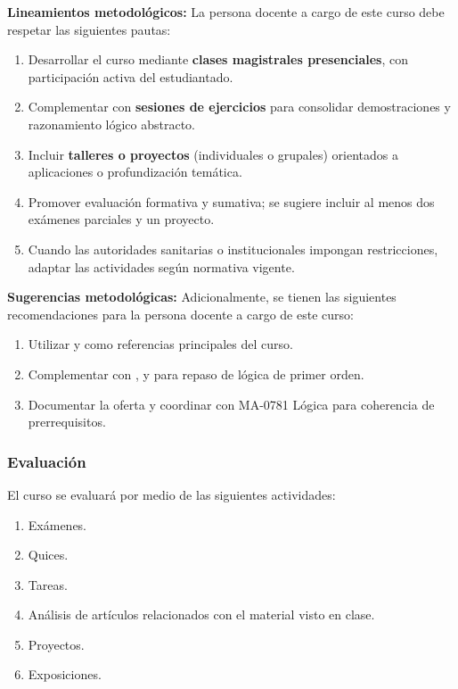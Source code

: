 \begin{refsection}
\noindent \textbf{Lineamientos metodológicos:} La persona docente a cargo de este curso debe respetar las siguientes pautas:

\begin{enumerate}
    \item Desarrollar el curso mediante \textbf{clases magistrales presenciales}, con participación activa del estudiantado.
    \item Complementar con \textbf{sesiones de ejercicios} para consolidar demostraciones y razonamiento lógico abstracto.
    \item Incluir \textbf{talleres o proyectos} (individuales o grupales) orientados a aplicaciones o profundización temática.
    \item Promover evaluación formativa y sumativa; se sugiere incluir al menos dos exámenes parciales y un proyecto.
    \item Cuando las autoridades sanitarias o institucionales impongan restricciones, adaptar las actividades según normativa vigente.
\end{enumerate}

\textbf{Sugerencias metodológicas:} Adicionalmente, se tienen las siguientes recomendaciones para la persona docente a cargo de este curso:

\begin{enumerate}
    \item Utilizar \cite{Mar02} y \cite{Poi00} como referencias principales del curso.
    \item Complementar con \cite{HiL19}, \cite{EFT94} y \cite{CL2000} para repaso de lógica de primer orden.
    \item Documentar la oferta y coordinar con MA-0781 Lógica para coherencia de prerrequisitos.
\end{enumerate}

\subsubsection*{Evaluación}

El curso se evaluará por medio de las siguientes actividades:

\begin{enumerate}
\item Exámenes.
\item Quices.
\item Tareas.
\item Análisis de artículos relacionados con el material visto en clase.
\item Proyectos.
\item Exposiciones.
\end{enumerate}

\nocite{HiL19}
\nocite{CL2000}
\nocite{EFT94}
\nocite{Mar02}
\nocite{Poi00}

\printcursosbibliography
\end{refsection}
